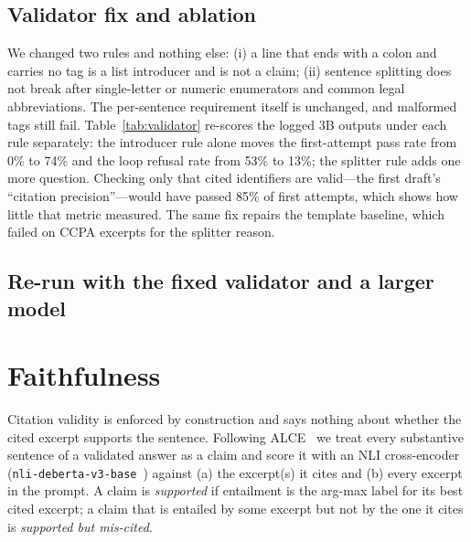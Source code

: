 \documentclass[conference]{IEEEtran}
\begin{document}
\subsection{Validator fix and ablation}
\label{sec:validator}
We changed two rules and nothing else: (i) a line that ends with a colon and carries no tag is a list introducer and is not a claim; (ii) sentence splitting does not break after single-letter or numeric enumerators and common legal abbreviations. The per-sentence requirement itself is unchanged, and malformed tags still fail. Table~\ref{tab:validator} re-scores the logged 3B outputs under each rule separately: the introducer rule alone moves the first-attempt pass rate from 0\% to 74\% and the loop refusal rate from 53\% to 13\%; the splitter rule adds one more question. Checking only that cited identifiers are valid---the first draft's ``citation precision''---would have passed 85\% of first attempts, which shows how little that metric measured. The same fix repairs the template baseline, which failed on CCPA excerpts for the splitter reason.

\begin{table}[t]
\centering
\caption{Validator ablation, re-scoring one logged 3B run (72 labelled questions).}
\label{tab:validator}
\scriptsize
\setlength{\tabcolsep}{3pt}
\resizebox{\columnwidth}{!}{}
\end{table}

\subsection{Re-run with the fixed validator and a larger model}


\begin{table}[t]
\centering
\caption{Refusal rate (\%) by category with the fixed validator (mean over runs). For out-of-scope questions refusal is the desired behaviour.}
\label{tab:refcat}
\scriptsize
\setlength{\tabcolsep}{4pt}
\resizebox{\columnwidth}{!}{}
\end{table}

\section{Faithfulness}
\label{sec:faith}
Citation validity is enforced by construction and says nothing about whether the cited excerpt supports the sentence. Following ALCE~\cite{gao2023alce} we treat every substantive sentence of a validated answer as a claim and score it with an NLI cross-encoder (\texttt{nli-deberta-v3-base}~\cite{he2023debertav3}) against (a) the excerpt(s) it cites and (b) every excerpt in the prompt. A claim is \emph{supported} if entailment is the arg-max label for its best cited excerpt; a claim that is entailed by some excerpt but not by the one it cites is \emph{supported but mis-cited}.
\end{document}
